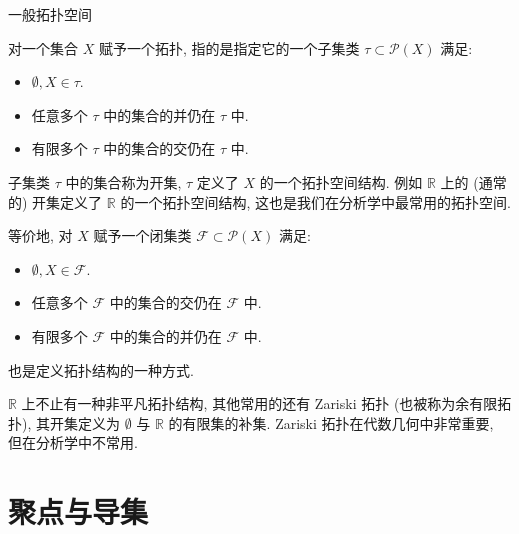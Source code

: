 \begin{frame}{一般拓扑空间}

{\color{red}} 对一个集合 $X$ 赋予一个\alert{拓扑}, 指的是指定它的一个子集类 $\tau \subset \mathcal{P}(X)$ 满足:
\begin{itemize}
\item $\emptyset, X \in \tau.$
\item 任意多个 $\tau$ 中的集合的并仍在 $\tau$ 中.
\item 有限多个 $\tau$ 中的集合的交仍在 $\tau$ 中.
\end{itemize}
子集类 $\tau$ 中的集合称为\alert{开集}, $\tau$ 定义了 $X$ 的一个\alert{拓扑空间}结构. 例如 $\mathbb{R}$ 上的 (通常的) 开集定义了 $\mathbb{R}$ 的一个拓扑空间结构, 这也是我们在分析学中最常用的拓扑空间.

\pause
\vspace{0.5em}

{\color{red}} 等价地, 对 $X$ 赋予一个\alert{闭集}类 $\mathcal{F} \subset \mathcal{P}(X)$ 满足:
\begin{itemize}
\item $\emptyset, X \in \mathcal{F}.$
\item 任意多个 $\mathcal{F}$ 中的集合的交仍在 $\mathcal{F}$ 中.
\item 有限多个 $\mathcal{F}$ 中的集合的并仍在 $\mathcal{F}$ 中.
\end{itemize}
也是定义拓扑结构的一种方式.

\pause
\vspace{0.5em}

\begin{remark}
$\mathbb{R}$ 上不止有一种非平凡拓扑结构, 其他常用的还有 Zariski 拓扑 (也被称为余有限拓扑), 其开集定义为 $\emptyset$ 与 $\mathbb{R}$ 的有限集的补集. Zariski 拓扑在代数几何中非常重要, 但在分析学中不常用.
\end{remark}

\end{frame}


\section[聚点导集]{聚点与导集}


